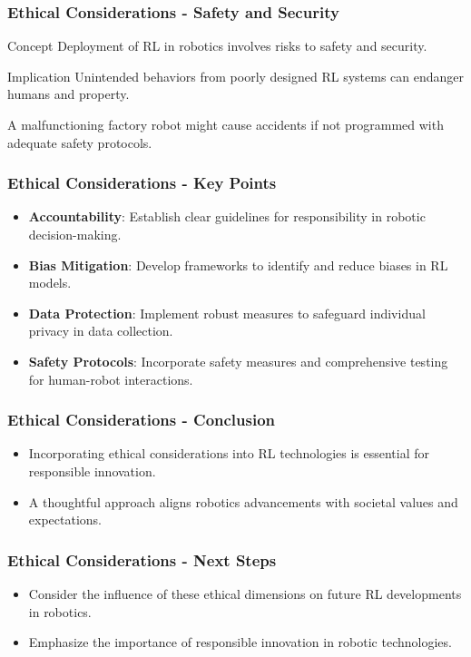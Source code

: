 \documentclass[aspectratio=169]{beamer}
\begin{document}
\begin{frame}[fragile]
  \frametitle{Ethical Considerations - Safety and Security}
  \begin{block}{Concept}
    Deployment of RL in robotics involves risks to safety and security.
  \end{block}
  \begin{block}{Implication}
    Unintended behaviors from poorly designed RL systems can endanger humans and property.
  \end{block}
  \begin{example}
    A malfunctioning factory robot might cause accidents if not programmed with adequate safety protocols.
  \end{example}
\end{frame}

\begin{frame}[fragile]
  \frametitle{Ethical Considerations - Key Points}
  \begin{itemize}
    \item \textbf{Accountability}: Establish clear guidelines for responsibility in robotic decision-making.
    \item \textbf{Bias Mitigation}: Develop frameworks to identify and reduce biases in RL models.
    \item \textbf{Data Protection}: Implement robust measures to safeguard individual privacy in data collection.
    \item \textbf{Safety Protocols}: Incorporate safety measures and comprehensive testing for human-robot interactions.
  \end{itemize}
\end{frame}

\begin{frame}[fragile]
  \frametitle{Ethical Considerations - Conclusion}
  \begin{itemize}
    \item Incorporating ethical considerations into RL technologies is essential for responsible innovation.
    \item A thoughtful approach aligns robotics advancements with societal values and expectations.
  \end{itemize}
\end{frame}

\begin{frame}[fragile]
  \frametitle{Ethical Considerations - Next Steps}
  \begin{itemize}
    \item Consider the influence of these ethical dimensions on future RL developments in robotics.
    \item Emphasize the importance of responsible innovation in robotic technologies.
  \end{itemize}
\end{frame}
\end{document}

